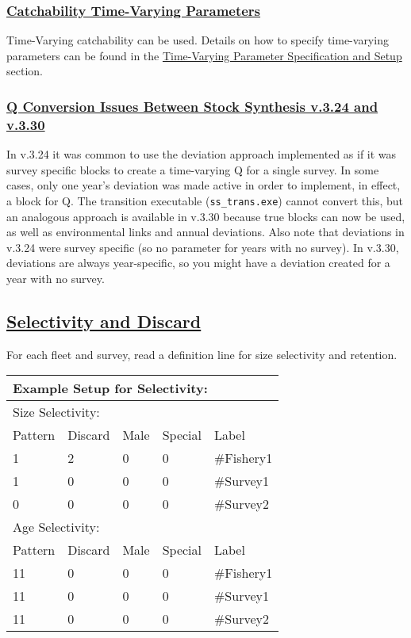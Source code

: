 \hypertarget{Q-TV}{}
\subsubsection[Catchability Time-Varying Parameters]{\protect\hyperlink{Q-TV}{Catchability Time-Varying Parameters}}
Time-Varying catchability can be used. Details on how to specify time-varying parameters can be found in the \hyperlink{tvOrder}{Time-Varying Parameter Specification and Setup} section.

\hypertarget{QConversion}{}
\subsubsection[Q Conversion Issues Between Stock Synthesis v.3.24 and v.3.30]{\protect\hyperlink{QConversion}{Q Conversion Issues Between Stock Synthesis v.3.24 and v.3.30}}
In v.3.24 it was common to use the deviation approach implemented as if it was survey specific blocks to create a time-varying Q for a single survey. In some cases, only one year's deviation was made active in order to implement, in effect, a block for Q. The transition executable (\texttt{ss\_trans.exe}) cannot convert this, but an analogous approach is available in v.3.30 because true blocks can now be used, as well as environmental links and annual deviations. Also note that deviations in v.3.24 were survey specific (so no parameter for years with no survey). In v.3.30, deviations are always year-specific, so you might have a deviation created for a year with no survey.

\hypertarget{SelDiscard}{}
\subsection[Selectivity and Discard]{\protect\hyperlink{SelDiscard}{Selectivity and Discard}}
For each fleet and survey, read a definition line for size selectivity and retention. 

\begin{center}
	\begin{longtable}{p{2cm} p{2cm} p{2cm} p{2cm} p{6.5cm}}
		\multicolumn{5}{l}{Example Setup for Selectivity:} \Tstrut\\
		\hline
		\multicolumn{5}{l}{Size Selectivity:} \Tstrut\\
		Pattern & Discard & Male & Special & Label \Bstrut\\
		\hline
		1 & 2 & 0 & 0 & \#Fishery1 \Tstrut\\
		1 & 0 & 0 & 0 & \#Survey1 \\
		0 & 0 & 0 & 0 & \#Survey2 \Bstrut\\
		\hline
		
		\multicolumn{5}{l}{Age Selectivity:} \Tstrut\\
		Pattern & Discard & Male & Special & Label \Bstrut\\
		\hline
		11 & 0 & 0 & 0 & \#Fishery1 \Tstrut\\
		11 & 0 & 0 & 0 & \#Survey1 \\
		11 & 0 & 0 & 0 & \#Survey2 \Bstrut\\
		\hline
	\end{longtable}
\end{center}

